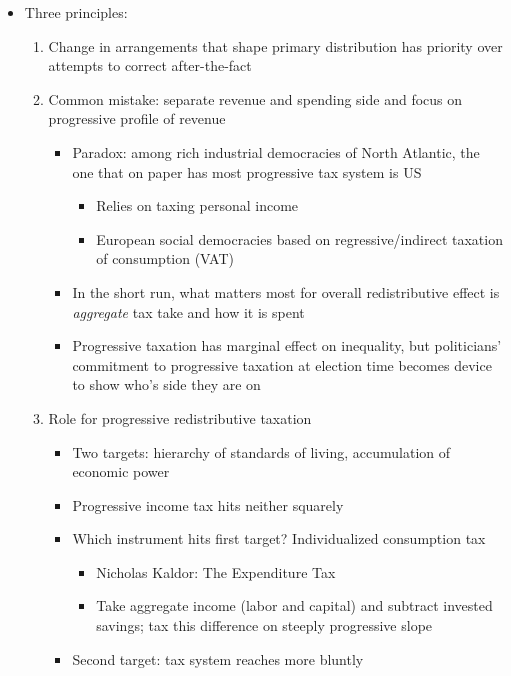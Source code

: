 \begin{itemize}
\tightlist
\item
  Three principles:

  \begin{enumerate}
  \def\labelenumi{\arabic{enumi}.}
  \tightlist
  \item
    Change in arrangements that shape primary distribution has priority
    over attempts to correct after-the-fact
  \item
    Common mistake: separate revenue and spending side and focus on
    progressive profile of revenue

    \begin{itemize}
    \tightlist
    \item
      Paradox: among rich industrial democracies of North Atlantic, the
      one that on paper has most progressive tax system is US

      \begin{itemize}
      \tightlist
      \item
        Relies on taxing personal income
      \item
        European social democracies based on regressive/indirect
        taxation of consumption (VAT)
      \end{itemize}
    \item
      In the short run, what matters most for overall redistributive
      effect is \emph{aggregate} tax take and how it is spent
    \item
      Progressive taxation has marginal effect on inequality, but
      politicians' commitment to progressive taxation at election time
      becomes device to show who's side they are on
    \end{itemize}
  \item
    Role for progressive redistributive taxation

    \begin{itemize}
    \tightlist
    \item
      Two targets: hierarchy of standards of living, accumulation of
      economic power
    \item
      Progressive income tax hits neither squarely
    \item
      Which instrument hits first target? Individualized consumption tax

      \begin{itemize}
      \tightlist
      \item
        Nicholas Kaldor: The Expenditure Tax
      \item
        Take aggregate income (labor and capital) and subtract invested
        savings; tax this difference on steeply progressive slope
      \end{itemize}
    \item
      Second target: tax system reaches more bluntly


\end{itemize}
\end{enumerate}
\end{itemize}
